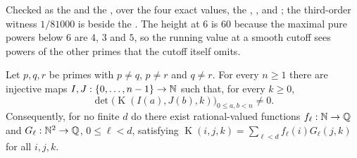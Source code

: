 \documentclass[11pt]{article}
\newcommand{\Kernel}{\operatorname{K}}
\begin{document}
\noindent Checked as the
 and the
, over the four exact values, the
,
,
 and
;
the third-order witness $1/81000$ is
beside the
.  The height at $6$ is $60$ because the maximal pure powers below $6$ are
$4$, $3$ and $5$, so the running value at a smooth cutoff sees powers of the
other primes that the cutoff itself omits.

\begin{theorem}\label{long269:res:infinite-rank}
\label{long269:res:lead-infinite-rank}
Let $p,q,r$ be primes with $p\ne q$, $p\ne r$ and $q\ne r$.  For every
$n\ge1$ there are injective maps $I,J:\{0,\ldots,n-1\}\to\mathbb{N}$ such that, for
every $k\ge0$,
\[
 \det\bigl(\Kernel(I(a),J(b),k)\bigr)_{0\le a,b<n}\ne0 .
\]
Consequently, for no finite $d$ do there exist rational-valued functions
$f_\ell:\mathbb{N}\to\mathbb{Q}$ and $G_\ell:\mathbb{N}^{2}\to\mathbb{Q}$, $0\le\ell<d$, satisfying
$\Kernel(i,j,k)=\sum_{\ell<d}f_\ell(i)G_\ell(j,k)$ for all $i,j,k$.
\end{theorem}
\end{document}
